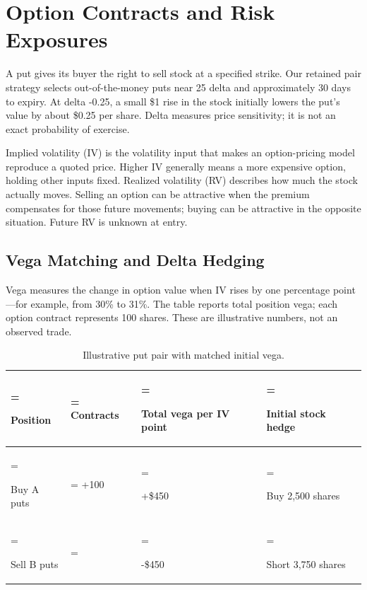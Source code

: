 \section{Option Contracts and Risk Exposures}\label{sec:3}

A put gives its buyer the right to sell stock at a specified strike. Our retained pair strategy selects out-of-the-money puts near 25 delta and approximately 30 days to expiry. At delta -0.25, a small \$1 rise in the stock initially lowers the put's value by about \$0.25 per share. Delta measures price sensitivity; it is not an exact probability of exercise.


Implied volatility (IV) is the volatility input that makes an option-pricing model reproduce a quoted price. Higher IV generally means a more expensive option, holding other inputs fixed. Realized volatility (RV) describes how much the stock actually moves. Selling an option can be attractive when the premium compensates for those future movements; buying can be attractive in the opposite situation. Future RV is unknown at entry.


\subsection*{Vega Matching and Delta Hedging}

Vega measures the change in option value when IV rises by one percentage point---for example, from 30\% to 31\%. The table reports total position vega; each option contract represents 100 shares. These are illustrative numbers, not an observed trade.


\begin{table}[H]\centering\small
\caption{Illustrative put pair with matched initial vega.}
\setlength{\tabcolsep}{4pt}\renewcommand{\arraystretch}{1.18}
\begin{tabularx}{\textwidth}{@{}>{\hsize=0.84375\hsize\linewidth=\hsize\raggedright\arraybackslash}X>{\hsize=0.58594\hsize\linewidth=\hsize\raggedleft\arraybackslash}X>{\hsize=1.21094\hsize\linewidth=\hsize\raggedright\arraybackslash}X>{\hsize=1.35938\hsize\linewidth=\hsize\raggedright\arraybackslash}X@{}}\toprule
\textbf{Position} & \textbf{Contracts} & \textbf{Total vega per IV point} & \textbf{Initial stock hedge}\\\midrule
Buy A puts & +100 & +\$450 & Buy 2,500 shares\\
Sell B puts & -150 & -\$450 & Short 3,750 shares\\
\bottomrule\end{tabularx}\end{table}

